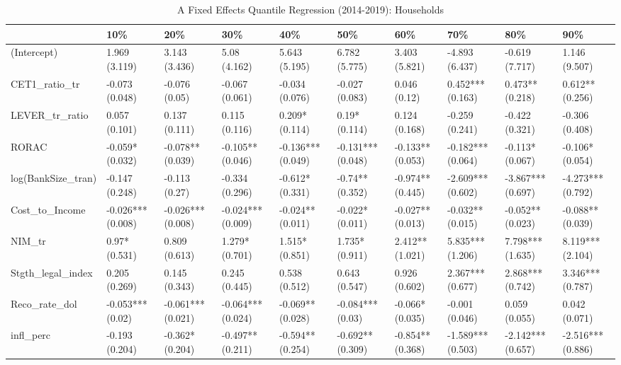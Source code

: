 \begin{table}[ht]
\centering
\caption{A Fixed Effects Quantile Regression (2014-2019): Households} 
\begingroup\small
\begin{tabular}{llllllllll}
  \toprule
 & 10\% & 20\% & 30\% & 40\% & 50\% & 60\% & 70\% & 80\% & 90\% \\ 
  \midrule
(Intercept) & 1.969 (3.119) & 3.143 (3.436) & 5.08 (4.162) & 5.643 (5.195) & 6.782 (5.775) & 3.403 (5.821) & -4.893 (6.437) & -0.619 (7.717) & 1.146 (9.507) \\ 
  CET1\_ratio\_tr & -0.073 (0.048) & -0.076 (0.05) & -0.067 (0.061) & -0.034 (0.076) & -0.027 (0.083) & 0.046 (0.12) & 0.452*** (0.163) & 0.473** (0.218) & 0.612** (0.256) \\ 
  LEVER\_tr\_ratio & 0.057 (0.101) & 0.137 (0.111) & 0.115 (0.116) & 0.209* (0.114) & 0.19* (0.114) & 0.124 (0.168) & -0.259 (0.241) & -0.422 (0.321) & -0.306 (0.408) \\ 
  RORAC & -0.059* (0.032) & -0.078** (0.039) & -0.105** (0.046) & -0.136*** (0.049) & -0.131*** (0.048) & -0.133** (0.053) & -0.182*** (0.064) & -0.113* (0.067) & -0.106* (0.054) \\ 
  log(BankSize\_tran) & -0.147 (0.248) & -0.113 (0.27) & -0.334 (0.296) & -0.612* (0.331) & -0.74** (0.352) & -0.974** (0.445) & -2.609*** (0.602) & -3.867*** (0.697) & -4.273*** (0.792) \\ 
  Cost\_to\_Income & -0.026*** (0.008) & -0.026*** (0.008) & -0.024*** (0.009) & -0.024** (0.011) & -0.022* (0.011) & -0.027** (0.013) & -0.032** (0.015) & -0.052** (0.023) & -0.088** (0.039) \\ 
  NIM\_tr & 0.97* (0.531) & 0.809 (0.613) & 1.279* (0.701) & 1.515* (0.851) & 1.735* (0.911) & 2.412** (1.021) & 5.835*** (1.206) & 7.798*** (1.635) & 8.119*** (2.104) \\ 
  Stgth\_legal\_index & 0.205 (0.269) & 0.145 (0.343) & 0.245 (0.445) & 0.538 (0.512) & 0.643 (0.547) & 0.926 (0.602) & 2.367*** (0.677) & 2.868*** (0.742) & 3.346*** (0.787) \\ 
  Reco\_rate\_dol & -0.053*** (0.02) & -0.061*** (0.021) & -0.064*** (0.024) & -0.069** (0.028) & -0.084*** (0.03) & -0.066* (0.035) & -0.001 (0.046) & 0.059 (0.055) & 0.042 (0.071) \\ 
  infl\_perc & -0.193 (0.204) & -0.362* (0.204) & -0.497** (0.211) & -0.594** (0.254) & -0.692** (0.309) & -0.854** (0.368) & -1.589*** (0.503) & -2.142*** (0.657) & -2.516*** (0.886) \\ 

\end{tabular}
\end{table}
